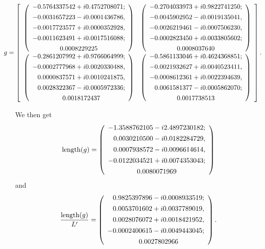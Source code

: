 \begin{small}
$$ \hskip-18pt
g = \left[\begin{array}{cc}
  \left(\begin{array}{c}
    -0.5764337542 + i 0.4752708071;\\[4pt]
    -0.0031657223 - i 0.0001436786,\\[4pt]
    -0.0017723577 + i 0.0000352928,\\[4pt]
    -0.0011623491 + i 0.0017516088;\\[4pt]
    0.0008229225
  \end{array}\right)
 &
  \left(\begin{array}{c}
    -0.2704033973 + i 0.9822741250;\\[4pt]
    -0.0045902952 - i 0.0019135041,\\[4pt]
    -0.0026219461 - i 0.0007506230,\\[4pt]
    -0.0002823450 + i 0.0033805602;\\[4pt]
    0.0008037640
  \end{array}\right)
 \\[9pt]
  \left(\begin{array}{c}
    -0.2861207992 + i 0.9766064999;\\[4pt]
    -0.0002777968 + i 0.0020330488,\\[4pt]
   \phantom{-} 0.0000837571 + i 0.0010241875,\\[4pt]
   \phantom{-} 0.0028322367 - i 0.0005972336;\\[4pt]
   \phantom{-} 0.0018172437
  \end{array}\right)
 &
  \left(\begin{array}{c}
    -0.5861133046 + i 0.4624368851;\\[4pt]
    -0.0021932627 + i 0.0040523411,\\[4pt]
    -0.0008612361 + i 0.0022394639,\\[4pt]
   \phantom{-} 0.0061581377 - i 0.0005862070;\\[4pt]
    0.0017738513
  \end{array}\right)
\end{array}\right].
$$
\end{small}
We then get
$$
{\rm length}(g) = \left(\begin{array}{c}
    -1.3588762105 - i 2.4897230182;\\[4pt]
  \phantom{-}  0.0030210500 - i 0.0182284729,\\[4pt]
   \phantom{-} 0.0007938572 - i 0.0096614614,\\[4pt]
    -0.0122034521 + i 0.0074353043;\\[4pt]
    0.0080071969
  \end{array}\right)
$$
and
$$
{{\rm length}(g) \over L'} =
  \left(\begin{array}{c}
   \phantom{-} 0.9825397896 - i 0.0008933519;\\[4pt]
   \phantom{-} 0.0053701602 + i 0.0037789019,\\[4pt]
   \phantom{-} 0.0028076072 + i 0.0018421952,\\[4pt]
    -0.0002400615 - i 0.0049443045;\\[4pt]
   \phantom{-} 0.0027802966
  \end{array}\right).
$$


